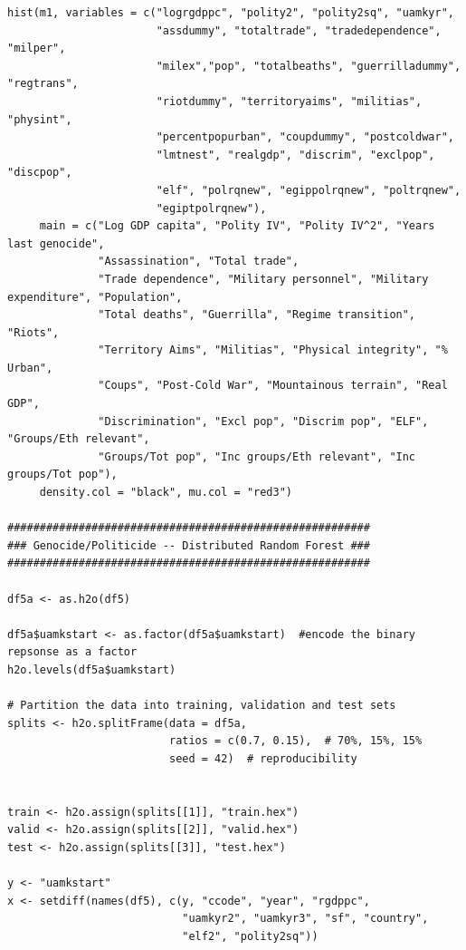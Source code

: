 \begin{verbatim}
hist(m1, variables = c("logrgdppc", "polity2", "polity2sq", "uamkyr",
                       "assdummy", "totaltrade", "tradedependence", "milper",
                       "milex","pop", "totalbeaths", "guerrilladummy", "regtrans",
                       "riotdummy", "territoryaims", "militias", "physint",
                       "percentpopurban", "coupdummy", "postcoldwar",
                       "lmtnest", "realgdp", "discrim", "exclpop", "discpop",
                       "elf", "polrqnew", "egippolrqnew", "poltrqnew",
                       "egiptpolrqnew"),
     main = c("Log GDP capita", "Polity IV", "Polity IV^2", "Years last genocide",
              "Assassination", "Total trade", 
              "Trade dependence", "Military personnel", "Military expenditure", "Population", 
              "Total deaths", "Guerrilla", "Regime transition", "Riots",
              "Territory Aims", "Militias", "Physical integrity", "% Urban",
              "Coups", "Post-Cold War", "Mountainous terrain", "Real GDP",
              "Discrimination", "Excl pop", "Discrim pop", "ELF", "Groups/Eth relevant", 
              "Groups/Tot pop", "Inc groups/Eth relevant", "Inc groups/Tot pop"),
     density.col = "black", mu.col = "red3")
     
########################################################
### Genocide/Politicide -- Distributed Random Forest ###
########################################################

df5a <- as.h2o(df5)

df5a$uamkstart <- as.factor(df5a$uamkstart)  #encode the binary repsonse as a factor
h2o.levels(df5a$uamkstart)

# Partition the data into training, validation and test sets
splits <- h2o.splitFrame(data = df5a, 
                         ratios = c(0.7, 0.15),  # 70%, 15%, 15%
                         seed = 42)  # reproducibility


train <- h2o.assign(splits[[1]], "train.hex")   
valid <- h2o.assign(splits[[2]], "valid.hex") 
test <- h2o.assign(splits[[3]], "test.hex")

y <- "uamkstart"
x <- setdiff(names(df5), c(y, "ccode", "year", "rgdppc",
                           "uamkyr2", "uamkyr3", "sf", "country",
                           "elf2", "polity2sq")) 


\end{verbatim}
